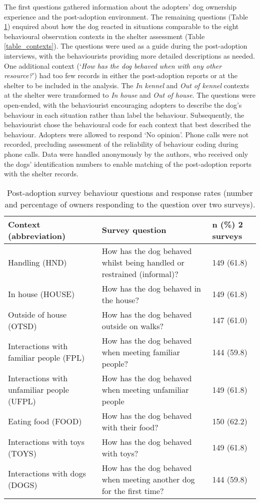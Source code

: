 \documentclass[12pt]{article}
\begin{document}
The first questions gathered information about the adopters' dog ownership experience and the post-adoption environment. The remaining questions (Table \ref{table_postadoptq}) enquired about how the dog reacted in situations comparable to the eight behavioural observation contexts in the shelter assessment (Table \ref{table_contexts}). The questions were used as a guide during the post-adoption interviews, with the behaviourists providing more detailed descriptions as needed. One additional context (‘\textit{How has the dog behaved when with any other resource?}’) had too few records in either the post-adoption reports or at the shelter to be included in the analysis. The \textit{In kennel} and \textit{Out of kennel} contexts at the shelter were transformed to \textit{In house} and \textit{Out of house}. The questions were open-ended, with the behaviourist encouraging adopters to describe the dog's behaviour in each situation rather than label the behaviour. Subsequently, the behaviourist chose the behavioural code for each context that best described the behaviour. Adopters were allowed to respond `No opinion'. Phone calls were not recorded, precluding assessment of the reliability of behaviour coding during phone calls. Data were handled anonymously by the authors, who received only the dogs' identification numbers to enable matching of the post-adoption reports with the shelter records.

\begin{table}
  \centering
  \begin{tabular}{p{6cm}p{6cm}p{4cm}}
    \textbf{Context (abbreviation)} & \textbf{Survey question} & \textbf{$\boldsymbol{n}$ (\%) 2 surveys}\\ \hline
    Handling (HND) & \footnotesize{How has the dog behaved whilst being handled or restrained (informal)?} & 149 (61.8)\\
    In house (HOUSE) & \footnotesize{How has the dog behaved in the house?} & 149 (61.8)\\
    Outside of house (OTSD) & \footnotesize{How has the dog behaved outside on walks?} & 147 (61.0)\\
    Interactions with familiar people (FPL) & \footnotesize{How has the dog behaved when meeting familiar people?} & 144 (59.8)\\
    Interactions with unfamiliar people (UFPL) & \footnotesize{How has the dog behaved when meeting unfamiliar people} & 149 (61.8)\\
    Eating food (FOOD) & \footnotesize{How has the dog behaved with their food?} & 150 (62.2)\\
    Interactions with toys (TOYS) & \footnotesize{How has the dog behaved with toys?} & 149 (61.8)\\
    Interactions with dogs (DOGS) & \footnotesize{How has the dog behaved when meeting another dog for the first time?} & 144 (59.8)\\
    \hline
  \end{tabular}
  \caption{Post-adoption survey behaviour questions and response rates (number and percentage of owners responding to the question over two surveys).}
  \label{table_postadoptq}
\end{table}
\end{document}
